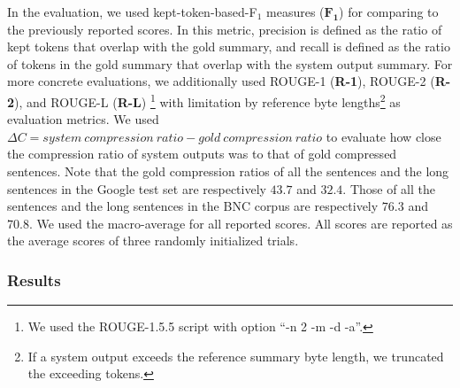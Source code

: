\documentclass[letterpaper]{article} \usepackage{aaai20}  \usepackage{times}  \usepackage{helvet} \usepackage{courier}  \usepackage[hyphens]{url}  \usepackage{graphicx} \urlstyle{rm} \def\UrlFont{\rm}  \usepackage{graphicx}  \frenchspacing  \setlength{\pdfpagewidth}{8.5in}  \setlength{\pdfpageheight}{11in}  \usepackage{tabu}
\begin{document}
In the evaluation, we used kept-token-based-F$_{1}$ measures ($\mathbf{F_{1}}$) for comparing to the previously reported scores.
In this metric, precision is defined as the ratio of kept tokens that overlap with the gold summary, and recall is defined as the ratio of tokens in the gold summary that overlap with the system output summary.
For more concrete evaluations, we additionally used ROUGE-1 (\textbf{R-1}), ROUGE-2 (\textbf{R-2}), and ROUGE-L (\textbf{R-L}) \cite{lin-och:2004:ACL}\footnote{We used the ROUGE-1.5.5 script with option ``-n 2 -m -d -a''.} with limitation by reference byte lengths\footnote{If a system output exceeds the reference summary byte length, we truncated the exceeding tokens.} as evaluation metrics.
We used $\Delta C = system\ compression\ ratio - gold\ compression\ ratio$ \cite{kamigaito-etal-2018-higher} to evaluate how close the compression ratio of system outputs was to that of gold compressed sentences.
Note that the gold compression ratios of all the sentences and the long sentences in the Google test set are respectively $43.7$ and $32.4$. Those of all the sentences and the long sentences in the BNC corpus are respectively $76.3$ and $70.8$.
We used the macro-average for all reported scores.
All scores are reported as the average scores of three randomly initialized trials.

\subsubsection{Results}
\end{document}
